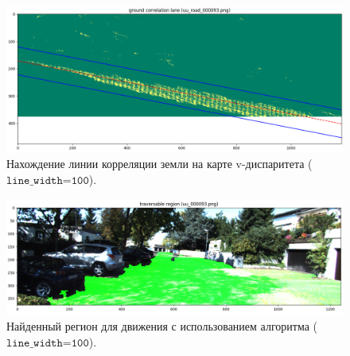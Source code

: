 \documentclass[oneside,final,12pt]{scrartcl}
\begin{document}
	\begin{figure}[p]
		\centering
		\includegraphics[width=0.7\linewidth]{gr_corelation_100.png}
		\caption{Нахождение линии корреляции земли на карте v-диспаритета (\(\texttt{line\_width=100}\)).}
		\label{fig:gr_corelation_100}
	\end{figure}

	\begin{figure}[p]
		\centering
		\includegraphics[width=0.7\linewidth]{img_with_tr_reg_100.png}
		\caption{Найденный регион для движения с использованием алгоритма (\(\texttt{line\_width=100}\)).}
		\label{fig:img_with_tr_reg_100}
	\end{figure}
\end{document}
